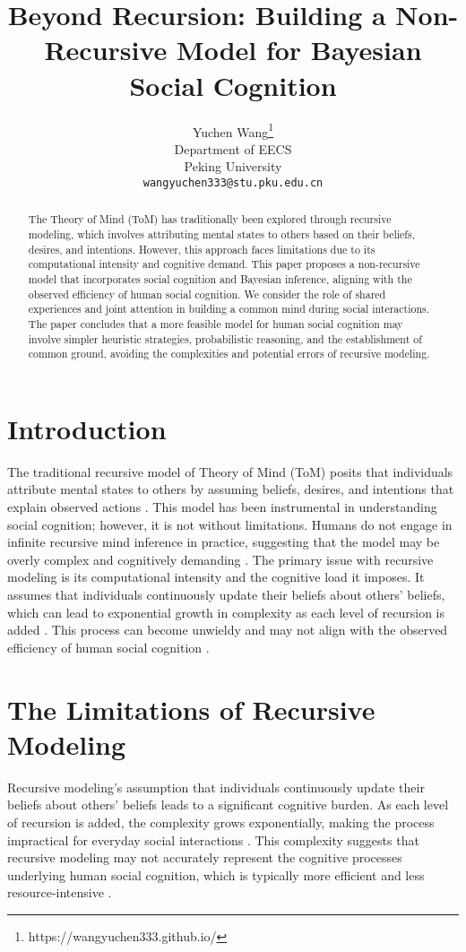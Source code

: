 \documentclass{article}
\title{Beyond Recursion: Building a Non-Recursive Model for Bayesian Social Cognition}
\author{%
  Yuchen Wang\thanks{https://wangyuchen333.github.io/} \\
  Department of EECS\\
  Peking University\\
  \texttt{wangyuchen333@stu.pku.edu.cn} \\
}
\begin{document}
\maketitle

\begin{abstract}
The Theory of Mind (ToM) has traditionally been explored through recursive modeling, which involves attributing mental states to others based on their beliefs, desires, and intentions. However, this approach faces limitations due to its computational intensity and cognitive demand. This paper proposes a non-recursive model that incorporates social cognition and Bayesian inference, aligning with the observed efficiency of human social cognition. We consider the role of shared experiences and joint attention in building a common mind during social interactions. The paper concludes that a more feasible model for human social cognition may involve simpler heuristic strategies, probabilistic reasoning, and the establishment of common ground, avoiding the complexities and potential errors of recursive modeling.
\end{abstract}


\section{Introduction}
The traditional recursive model of Theory of Mind (ToM) posits that individuals attribute mental states to others by assuming beliefs, desires, and intentions that explain observed actions \citep{premack1978does}. This model has been instrumental in understanding social cognition; however, it is not without limitations. Humans do not engage in infinite recursive mind inference in practice, suggesting that the model may be overly complex and cognitively demanding \citep{doshi2020recursively}. The primary issue with recursive modeling is its computational intensity and the cognitive load it imposes. It assumes that individuals continuously update their beliefs about others' beliefs, which can lead to exponential growth in complexity as each level of recursion is added \citep{doshi2020recursively}. This process can become unwieldy and may not align with the observed efficiency of human social cognition \citep{royzman2003know}.

\section{The Limitations of Recursive Modeling}
Recursive modeling's assumption that individuals continuously update their beliefs about others' beliefs leads to a significant cognitive burden. As each level of recursion is added, the complexity grows exponentially, making the process impractical for everyday social interactions \citep{doshi2020recursively}. This complexity suggests that recursive modeling may not accurately represent the cognitive processes underlying human social cognition, which is typically more efficient and less resource-intensive \citep{royzman2003know}.
\end{document}
